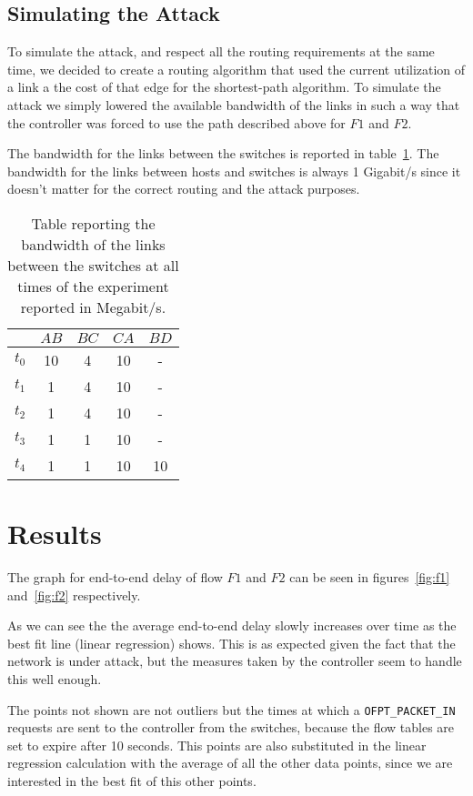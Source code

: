 \documentclass[twocolumn]{article}
\begin{document}
\subsection{Simulating the Attack}
To simulate the attack, and respect all the routing requirements at the same
time, we decided to create a routing algorithm that used the current utilization
of a link a the cost of that edge for the shortest-path algorithm. To simulate
the attack we simply lowered the available bandwidth of the links in such a way
that the controller was forced to use the path described above for $F1$ and
$F2$.

The bandwidth for the links between the switches is reported in
table~\ref{tab:band}. The bandwidth for the links between hosts and switches is
always 1 Gigabit/s since it doesn't matter for the correct routing and the
attack purposes.

\begin{table}
\centering
\begin{tabular}{c|cccc}
      & $AB$ & $BC$ & $CA$ & $BD$\\
\hline
$t_0$ & 10   & 4    & 10   & -\\
$t_1$ & 1    & 4    & 10   & -\\
$t_2$ & 1    & 4    & 10   & -\\
$t_3$ & 1    & 1    & 10   & -\\
$t_4$ & 1    & 1    & 10   & 10
\end{tabular}
\caption{Table reporting the bandwidth of the links between the switches at all
times of the experiment reported in Megabit/s.}
\label{tab:band}
\end{table}

\section{Results}
The graph for end-to-end delay of flow $F1$ and $F2$ can be seen in
figures~\ref{fig:f1} and~\ref{fig:f2} respectively.

As we can see the the average end-to-end delay slowly increases over time as the
best fit line (linear regression) shows. This is as expected given the fact that
the network is under attack, but the measures taken by the controller seem to
handle this well enough.

The points not shown are not outliers but the times at which a
\texttt{OFPT\_PACKET\_IN} requests are sent to the controller from the switches,
because the flow tables are set to expire after 10 seconds. This points are also
substituted in the linear regression calculation with the average of all the
other data points, since we are interested in the best fit of this other points.
\end{document}
